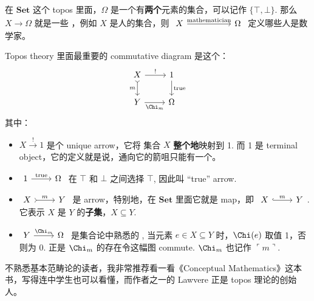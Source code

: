 在 $\mathbf{Set}$ 这个 topos 里面，$\Omega$ 是一个有\textbf{两个}元素的集合，可以记作 $\{ \top, \bot \}$.  那么 $X \rightarrow \Omega$ 就是一些 ，例如 $X$ 是人的集合，则 $\begin{tikzcd}[column sep = 12ex]
X \arrow[r, "\mathrm{mathematician}"] & \Omega \end{tikzcd}$ 定义哪些人是数学家。 

Topos theory 里面最重要的 commutative diagram 是这个：
\begin{equation}
\label{eqn:subobject-classifier}
\begin{tikzcd}[column sep = normal]
X \arrow[r, "!"] \arrow[d, tail, swap, "m"] & 1 \arrow[d, "\mathrm{true}"] \\
Y \arrow[r, swap, "\Chi_m"] & \Omega
\end{tikzcd}
\end{equation}
其中：
\begin{itemize}
	\item $X \stackrel{!}{\longrightarrow} 1$ 是个 unique arrow，它将 集合 $X$ \textbf{整个地}映射到 1. 而 1 是 terminal object，它的定义就是说，通向它的箭咀只能有一个。

	\item $\begin{tikzcd}1 \arrow[r, "\mathrm{true}"] & \Omega \end{tikzcd}$ 在 $\top$ 和 $\bot$ 之间选择 $\top$, 因此叫 ``true'' arrow.

	\item $\begin{tikzcd}X \arrow[r, tail, "m"] & Y \end{tikzcd}$ 是  arrow，特别地，在 $\mathbf{Set}$ 里面它就是  map，即 $\begin{tikzcd}X \arrow[r, hook, "m"] & Y \end{tikzcd}$.  它表示 $X$ 是 $Y$ 的\textbf{子集}，$X \subseteq Y$.

	\item $\begin{tikzcd}Y \arrow[r, "\Chi_m"] & \Omega \end{tikzcd}$ 是集合论中熟悉的 , 当元素 $e \in X \subseteq Y$ 时，$\Chi(e)$ 取值 1，否则为 0.  正是 $\Chi_m$ 的存在令这幅图 commute.  $\Chi_m$ 也记作 $\ulcorner m \urcorner$.
\end{itemize}
不熟悉基本范畴论的读者，我非常推荐看一看《Conceptual Mathematics》这本书，写得连中学生也可以看懂，而作者之一的 Lawvere 正是 topos 理论的创始人。 

